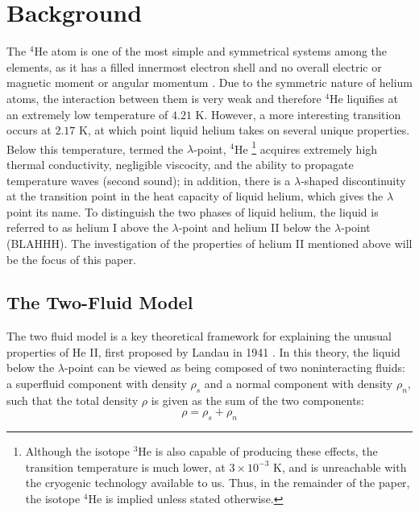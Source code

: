 
\section{Background}\label{background}

The $^4$He atom is one of the most simple and symmetrical systems
among the elements, as it has a filled innermost electron shell and no
overall electric or magnetic moment or angular momentum
\cite{atkins}. Due to the symmetric nature of helium atoms, the
interaction between them is very weak and therefore $^4$He liquifies at an
extremely low temperature of $4.21$ K. However, a more interesting
transition occurs at $2.17$ K, at which point liquid helium takes on
several unique properties. Below this temperature, termed the
$\lambda$-point, $^4$He \footnote{Although the isotope $^3$He is also
  capable of producing these effects, the transition temperature is
  much lower, at $3\times 10^{-3}$ K, and is unreachable with the
  cryogenic technology available to us. Thus, in the remainder of the
  paper, the isotope $^4$He is implied unless stated otherwise.}
acquires extremely high thermal conductivity, negligible viscocity,
and the ability to propagate temperature waves (second sound); in
addition, there is a $\lambda$-shaped discontinuity at the transition point
in the heat capacity of liquid helium, which gives the $\lambda$
point its name. To distinguish the two phases of liquid
helium, the liquid is referred to as helium I above the $\lambda$-point
and helium II below the $\lambda$-point (BLAHHH). The investigation of
the properties of helium II mentioned above will be the focus of this
paper.

\subsection{The Two-Fluid Model}\label{thetwofluidmodel}

The two fluid model is a key theoretical framework for explaining the
unusual properties of He II, first proposed by Landau in 1941
\cite{landau}. In this theory, the liquid below the $\lambda$-point
can be viewed as being composed of two noninteracting fluids: a
superfluid component with density $\rho_s$ and a normal component with
density $\rho_n$, such that the total density $\rho$ is given as the
sum of the two components:
\begin{equation}
\rho = \rho_s + \rho_n
\label{eqn:density}
\end{equation}

